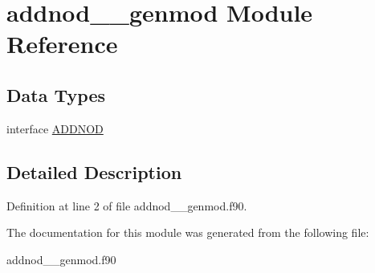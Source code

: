 \hypertarget{classaddnod____genmod}{\section{addnod\+\_\+\+\_\+genmod Module Reference}
\label{classaddnod____genmod}
}
\subsection*{Data Types}
\begin{DoxyCompactItemize}
\item 
interface \hyperlink{interfaceaddnod____genmod_1_1_a_d_d_n_o_d}{A\+D\+D\+N\+O\+D}
\end{DoxyCompactItemize}


\subsection{Detailed Description}


Definition at line 2 of file addnod\+\_\+\+\_\+genmod.\+f90.



The documentation for this module was generated from the following file\+:\begin{DoxyCompactItemize}
\item 
addnod\+\_\+\+\_\+genmod.\+f90\end{DoxyCompactItemize}
